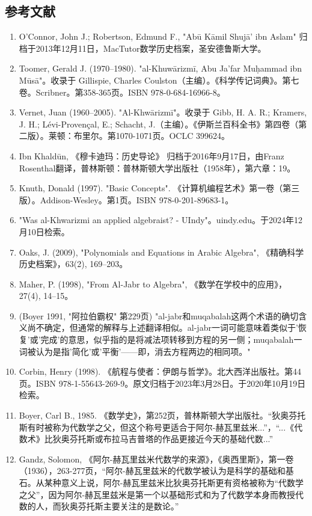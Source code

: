 \subsection{参考文献}  
\begin{enumerate}
\item O'Connor, John J.; Robertson, Edmund F., "Abū Kāmil Shujā' ibn Aslam" 归档于2013年12月11日，MacTutor数学历史档案，圣安德鲁斯大学。  
\item Toomer, Gerald J. (1970–1980). "al-Khuwārizmī, Abu Ja'far Muḥammad ibn Mūsā"。收录于 Gillispie, Charles Coulston（主编）。《科学传记词典》。第七卷。Scribner。第358-365页。ISBN 978-0-684-16966-8。  
\item Vernet, Juan (1960–2005). "Al-Khwārizmī"。收录于 Gibb, H. A. R.; Kramers, J. H.; Lévi-Provençal, E.; Schacht, J.（主编）。《伊斯兰百科全书》第四卷（第二版）。莱顿：布里尔。第1070-1071页。OCLC 399624。  
\item Ibn Khaldūn, 《穆卡迪玛：历史导论》 归档于2016年9月17日，由Franz Rosenthal翻译，普林斯顿：普林斯顿大学出版社（1958年），第六章：19。  
\item Knuth, Donald (1997). "Basic Concepts". 《计算机编程艺术》第一卷（第三版）。Addison-Wesley。第1页。ISBN 978-0-201-89683-1。  
\item "Was al-Khwarizmi an applied algebraist? - UIndy"。uindy.edu。于2024年12月10日检索。  
\item Oaks, J. (2009), "Polynomials and Equations in Arabic Algebra", 《精确科学历史档案》，63(2), 169–203。  
\item Maher, P. (1998), "From Al-Jabr to Algebra", 《数学在学校中的应用》，27(4), 14–15。  
\item (Boyer 1991, "阿拉伯霸权" 第229页) "al-jabr和muqabalah这两个术语的确切含义尚不确定，但通常的解释与上述翻译相似。al-jabr一词可能意味着类似于'恢复'或'完成'的意思，似乎指的是将减法项转移到方程的另一侧；muqabalah一词被认为是指'简化'或'平衡'——即，消去方程两边的相同项。"  
\item Corbin, Henry (1998). 《航程与使者：伊朗与哲学》。北大西洋出版社。第44页。ISBN 978-1-55643-269-9。原文归档于2023年3月28日。于2020年10月19日检索。
\item Boyer, Carl B., 1985. 《数学史》，第252页，普林斯顿大学出版社。“狄奥芬托斯有时被称为代数学之父，但这个称号更适合于阿尔-赫瓦里兹米...”，“...《代数术》比狄奥芬托斯或布拉马吉普塔的作品更接近今天的基础代数...”  
\item Gandz, Solomon, 《阿尔-赫瓦里兹米代数学的来源》，《奥西里斯》，第一卷（1936），263-277页，“阿尔-赫瓦里兹米的代数学被认为是科学的基础和基石。从某种意义上说，阿尔-赫瓦里兹米比狄奥芬托斯更有资格被称为“代数学之父”，因为阿尔-赫瓦里兹米是第一个以基础形式和为了代数学本身而教授代数的人，而狄奥芬托斯主要关注的是数论。”  

\end{enumerate}
